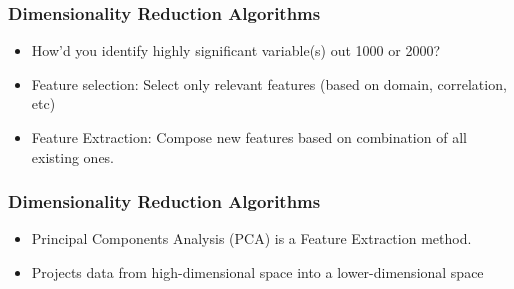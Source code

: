 \begin{frame}[fragile]\frametitle{ Dimensionality Reduction Algorithms}
\begin{itemize}
\item  How'd  you  identify  highly  significant variable(s) out 1000 or 2000?
\item Feature selection: Select only relevant features (based on domain, correlation, etc)
\item Feature Extraction: Compose new features based on combination of all existing ones.
\end{itemize}
\end{frame}


\begin{frame}[fragile]\frametitle{ Dimensionality Reduction Algorithms}
\begin{itemize}
\item Principal Components Analysis (PCA) is a Feature Extraction method.
\item Projects data from high-dimensional space into a lower-dimensional space
\end{itemize}
\end{frame}




